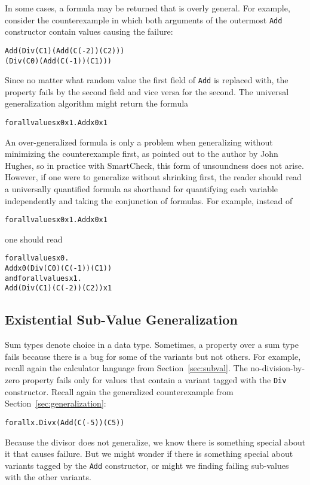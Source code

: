 \documentclass{sigplanconf}
\newenvironment{code}{\begin{alltt}\footnotesize}{\end{alltt}}
\newcommand{\ttp}[1]{\texttt{#1}}
\begin{document}
In some cases, a formula may be returned that is overly general.  For example,
consider the counterexample in which both arguments of the outermost \ttp{Add}
constructor contain values causing the failure:
%
\begin{code}
Add (Div (C 1) (Add (C (-2)) (C 2)))
    (Div (C 0) (Add (C (-1)) (C 1)))
\end{code}
%
\noindent
Since no matter what random value the first field of \ttp{Add} is replaced with,
the property fails by the second field and vice versa for the second.  The
universal generalization algorithm might return the formula
\noindent
%
\begin{code}
forall values x0 x1 . Add x0 x1
\end{code}
%
\noindent
An over-generalized formula is only a problem when generalizing without
minimizing the counterexample first, as pointed out to the author by John
Hughes, so in practice with SmartCheck, this form of unsoundness does not arise.
However, if one were to generalize without shrinking first, the reader should
read a universally quantified formula as shorthand for quantifying each variable
independently and taking the conjunction of formulas.  For example, instead of
%
\begin{code}
forall values x0 x1 . Add x0 x1
\end{code}
%
\noindent
one should read
%
%
\begin{code}
      forall values x0 .
        Add x0 (Div (C 0) (C (-1)) (C 1))
  and forall values x1 .
        Add (Div (C 1) (C (-2)) (C 2)) x1
\end{code}


\subsection{Existential Sub-Value Generalization}\label{sec:existential}

Sum types denote choice in a data type.  Sometimes, a property over a sum type
fails because there is a bug for some of the variants but not others.  For
example, recall again the calculator language from Section~\ref{sec:subval}.  The
no-division-by-zero property fails only for values that contain a variant tagged
with the \ttp{Div} constructor.  Recall again the generalized counterexample
from Section~\ref{sec:generalization}:
%
\begin{code}
forall x . Div x (Add (C (-5)) (C 5))
\end{code}
%
\noindent
Because the divisor does not generalize, we know there is something special
about it that causes failure.  But we might wonder if there is something special
about variants tagged by the \ttp{Add} constructor, or might we finding failing
sub-values with the other variants.
\end{document}
